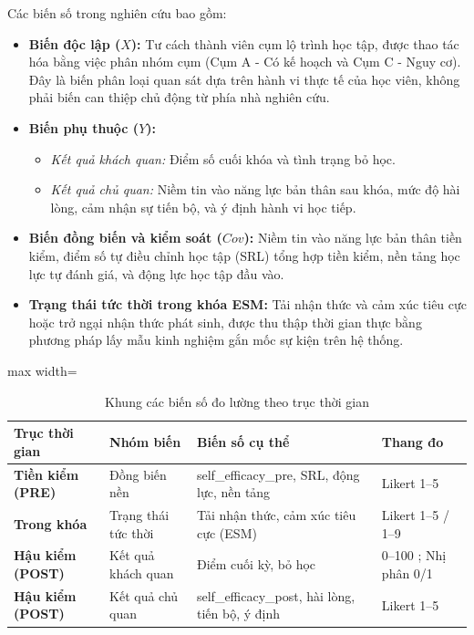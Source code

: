 Các biến số trong nghiên cứu bao gồm:
\begin{itemize}
    \item \textbf{Biến độc lập ($X$):} Tư cách thành viên cụm lộ trình học tập, được thao tác hóa bằng việc phân nhóm cụm (Cụm A - Có kế hoạch và Cụm C - Nguy cơ). Đây là biến phân loại quan sát dựa trên hành vi thực tế của học viên, không phải biến can thiệp chủ động từ phía nhà nghiên cứu.
    \item \textbf{Biến phụ thuộc ($Y$):}
    \begin{itemize}
        \item \textit{Kết quả khách quan:} Điểm số cuối khóa và tình trạng bỏ học.
        \item \textit{Kết quả chủ quan:} Niềm tin vào năng lực bản thân sau khóa, mức độ hài lòng, cảm nhận sự tiến bộ, và ý định hành vi học tiếp.
    \end{itemize}
    \item \textbf{Biến đồng biến và kiểm soát ($Cov$):} Niềm tin vào năng lực bản thân tiền kiểm, điểm số tự điều chỉnh học tập (SRL) tổng hợp tiền kiểm, nền tảng học lực tự đánh giá, và động lực học tập đầu vào.
    \item \textbf{Trạng thái tức thời trong khóa ESM:} Tải nhận thức và cảm xúc tiêu cực hoặc trở ngại nhận thức phát sinh, được thu thập thời gian thực bằng phương pháp lấy mẫu kinh nghiệm gắn mốc sự kiện trên hệ thống.
\end{itemize}

\begin{table}[H]
\centering
\caption{Khung các biến số đo lường theo trục thời gian}
\label{tab:cac_bien_do_luong}
\begin{adjustbox}{max width=\textwidth}
\begin{tabular}{llp{5.5cm}l}
\toprule
\textbf{Trục thời gian} & \textbf{Nhóm biến} & \textbf{Biến số cụ thể} & \textbf{Thang đo} \\
\midrule
\textbf{Tiền kiểm (PRE)} & Đồng biến nền & self\_efficacy\_pre, SRL, động lực, nền tảng & Likert 1--5 \\
\textbf{Trong khóa} & Trạng thái tức thời & Tải nhận thức, cảm xúc tiêu cực (ESM) & Likert 1--5 / 1--9 \\
\textbf{Hậu kiểm (POST)} & Kết quả khách quan & Điểm cuối kỳ, bỏ học & 0--100 ; Nhị phân 0/1 \\
\textbf{Hậu kiểm (POST)} & Kết quả chủ quan & self\_efficacy\_post, hài lòng, tiến bộ, ý định & Likert 1--5 \\
\bottomrule
\end{tabular}
\end{adjustbox}
\end{table}


